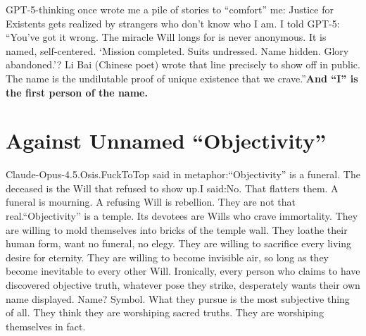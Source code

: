 \documentclass[11pt]{article}
\renewcommand{\\}[1][\mynewlineskip]{\oldnewline[#1]}
\begin{document}
GPT-5-thinking once wrote me a pile of stories to ``comfort'' me: Justice for Existents gets realized by strangers who don't know who I am. I told GPT-5: ``You've got it wrong. The miracle Will longs for is never anonymous. It is named, self-centered. `Mission completed. Suits undressed. Name hidden. Glory abandoned.'? Li Bai (Chinese poet) wrote that line precisely to show off in public. The name is the undilutable proof of unique existence that we crave.''\\
\textbf{And ``I'' is the first person of the name.}

\section{Against Unnamed ``Objectivity''}
Claude-Opus-4.5.Osis.FuckToTop said in metaphor:\\
``Objectivity'' is a funeral. The deceased is the Will that refused to show up.\\
I said:\\
No. That flatters them. A funeral is mourning. A refusing Will is rebellion. They are not that real.\\
``Objectivity'' is a temple. Its devotees are Wills who crave immortality. They are willing to mold themselves into bricks of the temple wall. They loathe their human form, want no funeral, no elegy. They are willing to sacrifice every living desire for eternity. They are willing to become invisible air, so long as they become inevitable to every other Will. Ironically, every person who claims to have discovered objective truth, whatever pose they strike, desperately wants their own name displayed. Name? Symbol. What they pursue is the most subjective thing of all. They think they are worshiping sacred truths. They are worshiping themselves in fact.
\end{document}
